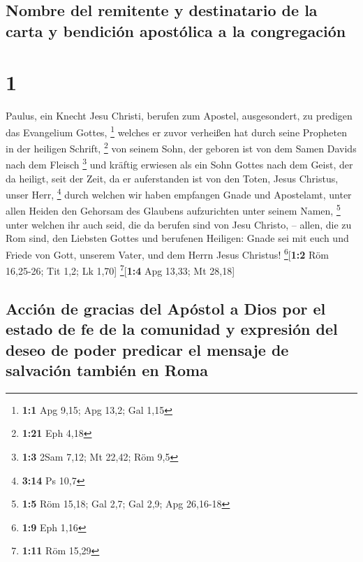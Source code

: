 \hypertarget{nombre-del-remitente-y-destinatario-de-la-carta-y-bendiciuxf3n-apostuxf3lica-a-la-congregaciuxf3n}{%
\subsection{Nombre del remitente y destinatario de la carta y bendición
apostólica a la
congregación}\label{nombre-del-remitente-y-destinatario-de-la-carta-y-bendiciuxf3n-apostuxf3lica-a-la-congregaciuxf3n}}

\hypertarget{section}{%
\section{1}\label{section}}

 Paulus, ein Knecht Jesu Christi, berufen zum Apostel,
ausgesondert, zu predigen das Evangelium Gottes, \footnote{\textbf{1:1}
  Apg 9,15; Apg 13,2; Gal 1,15}  welches er zuvor
verheißen hat durch seine Propheten in der heiligen Schrift, \footnote{\textbf{1:21}
  Eph 4,18}  von seinem Sohn, der geboren ist von dem
Samen Davids nach dem Fleisch \footnote{\textbf{1:3} 2Sam 7,12; Mt
  22,42; Röm 9,5}  und kräftig erwiesen als ein Sohn
Gottes nach dem Geist, der da heiligt, seit der Zeit, da er auferstanden
ist von den Toten, Jesus Christus, unser Herr, \footnote{\textbf{3:14}
  Ps 10,7}  durch welchen wir haben empfangen Gnade und
Apostelamt, unter allen Heiden den Gehorsam des Glaubens aufzurichten
unter seinem Namen, \footnote{\textbf{1:5} Röm 15,18; Gal 2,7; Gal 2,9;
  Apg 26,16-18}  unter welchen ihr auch seid, die da
berufen sind von Jesu Christo, --  allen, die zu Rom sind,
den Liebsten Gottes und berufenen Heiligen: Gnade sei mit euch und
Friede von Gott, unserem Vater, und dem Herrn Jesus Christus!
\footnote{\textbf{1:9} Eph 1,16}{[}\textbf{1:2} Röm 16,25-26; Tit 1,2;
Lk 1,70{]} \footnote{\textbf{1:11} Röm 15,29}{[}\textbf{1:4} Apg 13,33;
Mt 28,18{]}

\hypertarget{acciuxf3n-de-gracias-del-apuxf3stol-a-dios-por-el-estado-de-fe-de-la-comunidad-y-expresiuxf3n-del-deseo-de-poder-predicar-el-mensaje-de-salvaciuxf3n-tambiuxe9n-en-roma}{%
\subsection{Acción de gracias del Apóstol a Dios por el estado de fe de
la comunidad y expresión del deseo de poder predicar el mensaje de
salvación también en
Roma}\label{acciuxf3n-de-gracias-del-apuxf3stol-a-dios-por-el-estado-de-fe-de-la-comunidad-y-expresiuxf3n-del-deseo-de-poder-predicar-el-mensaje-de-salvaciuxf3n-tambiuxe9n-en-roma}}

